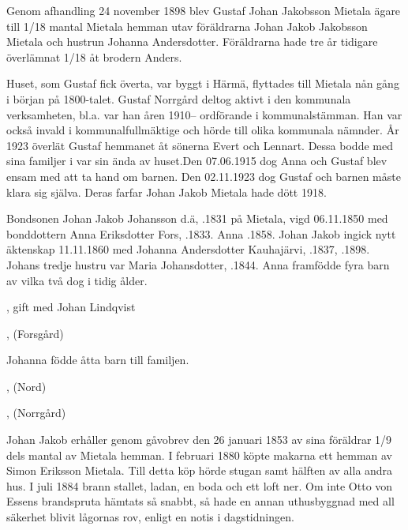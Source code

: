 Genom afhandling 24 november 1898 blev Gustaf Johan Jakobsson Mietala ägare till 1/18 mantal Mietala hemman utav föräldrarna Johan Jakob Jakobsson Mietala och hustrun Johanna Andersdotter. Föräldrarna hade tre år tidigare överlämnat 1/18 åt brodern Anders.

Huset, som Gustaf fick överta, var byggt i Härmä, flyttades till Mietala nån gång i början på 1800-talet. Gustaf Norrgård deltog aktivt i den kommunala verksamheten, bl.a. var han åren 1910-- ordförande i kommunalstämman. Han var också invald i kommunalfullmäktige och hörde till olika kommunala nämnder. År 1923 överlät Gustaf hemmanet åt sönerna Evert och
Lennart. Dessa bodde med sina familjer i var sin ända av huset.Den 07.06.1915 dog Anna och Gustaf blev ensam med att ta hand om barnen. Den 02.11.1923 dog Gustaf och barnen måste klara sig själva. Deras farfar Johan Jakob Mietala hade dött 1918.


Bondsonen Johan Jakob Johansson d.ä, .1831 på Mietala, vigd 06.11.1850 med bonddottern Anna Eriksdotter Fors, .1833. Anna .1858. Johan Jakob ingick nytt äktenskap 11.11.1860 med Johanna Andersdotter Kauhajärvi, .1837, .1898. Johans tredje hustru var Maria Johansdotter,  .1844.
Anna framfödde fyra barn av vilka två dog i tidig ålder.
\begin{jhchildren}
  \item {}, gift med Johan Lindqvist
  \item {}, (Forsgård)
  \item {}
  \item {}
\end{jhchildren}

Johanna födde åtta barn till familjen.
\begin{jhchildren}
  \item {}, (Nord)
  \item {}
  \item {}
  \item {}
  \item {}
  \item {}
  \item {}, (Norrgård)
  \item {}
\end{jhchildren}
Johan Jakob erhåller genom gåvobrev den 26 januari 1853 av sina föräldrar 1/9 dels mantal av Mietala hemman. I februari 1880 köpte makarna ett hemman av Simon Eriksson Mietala. Till detta köp hörde stugan samt hälften av alla andra hus. I juli 1884 brann stallet, ladan, en boda och ett loft ner. Om inte Otto von Essens brandspruta hämtats så snabbt, så hade en annan uthusbyggnad med all säkerhet blivit lågornas rov, enligt en notis i dagstidningen.

